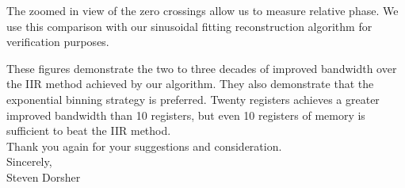 \documentclass[11pt]{article}
\begin{document}

The zoomed in view of the zero crossings allow us to measure relative phase. We use this comparison with our sinusoidal fitting reconstruction algorithm for verification purposes. \\


These figures demonstrate the two to three decades of improved bandwidth over the IIR method achieved by our algorithm. They also demonstrate that the exponential binning strategy is preferred. Twenty registers achieves a greater improved bandwidth than 10 registers, but even 10 registers of memory is sufficient to beat the IIR method. \\


\noindent Thank you again for your suggestions and consideration.\\ 

\noindent Sincerely, \\
Steven Dorsher
\end{document}
